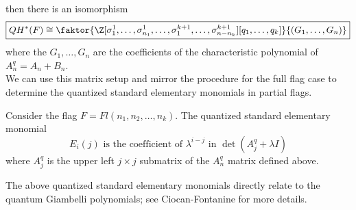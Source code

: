 \documentclass[11pt]{article}
\begin{document}
then there is an isomorphism
\[
    \boxed{QH^*(F) \cong \faktor{\Z[\sigma_1^1, \dots, \sigma_{n_1}^1, \dots, \sigma_1^{k+1}, \dots, \sigma_{n-n_k}^{k+1}][q_1, \dots, q_k]}{(G_1, \dots, G_n)}}
\]
where the $G_1, \dots, G_n$ are the coefficients of the characteristic polynomial of $A_n^q = A_n + B_n$. \\

We can use this matrix setup and mirror the procedure for the full flag case to determine the quantized standard elementary monomials in partial flags. 

\begin{theorem}
Consider the flag $F = Fl(n_1, n_2, \dots, n_k)$. The quantized standard elementary monomial 
\[
    E_{i}(j) \text{ is the coefficient of } \lambda^{i-j} \text{ in } \det (A_j^q + \lambda I)
\] 
where $A_j^q$ is the upper left $j \times j$ submatrix of the $A_n^q$ matrix defined above.
\end{theorem}

\begin{remark}
The above quantized standard elementary monomials directly relate to the quantum Giambelli polynomials; see Ciocan-Fontanine for more details.
\end{remark}
\end{document}
